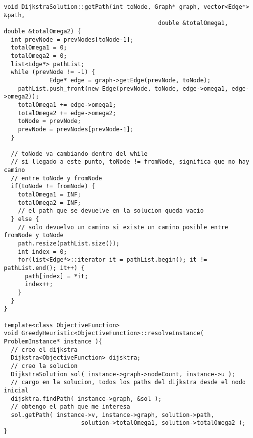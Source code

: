 \small
\begin{verbatim}
void DijkstraSolution::getPath(int toNode, Graph* graph, vector<Edge*> &path, 
                                            double &totalOmega1, double &totalOmega2) {           
  int prevNode = prevNodes[toNode-1];
  totalOmega1 = 0;
  totalOmega2 = 0;    
  list<Edge*> pathList;
  while (prevNode != -1) {
             Edge* edge = graph->getEdge(prevNode, toNode);
    pathList.push_front(new Edge(prevNode, toNode, edge->omega1, edge->omega2));
    totalOmega1 += edge->omega1;
    totalOmega2 += edge->omega2;
    toNode = prevNode;
    prevNode = prevNodes[prevNode-1];
  }    

  // toNode va cambiando dentro del while
  // si llegado a este punto, toNode != fromNode, significa que no hay camino 
  // entre toNode y fromNode  
  if(toNode != fromNode) {
    totalOmega1 = INF;
    totalOmega2 = INF;
    // el path que se devuelve en la solucion queda vacio
  } else {
    // solo devuelvo un camino si existe un camino posible entre fromNode y toNode
    path.resize(pathList.size());
    int index = 0;
    for(list<Edge*>::iterator it = pathList.begin(); it != pathList.end(); it++) {
      path[index] = *it;
      index++;
    }
  }
}

template<class ObjectiveFunction>
void GreedyHeuristic<ObjectiveFunction>::resolveInstance( ProblemInstance* instance ){
  // creo el dijkstra
  Dijkstra<ObjectiveFunction> dijsktra;
  // creo la solucion
  DijkstraSolution sol( instance->graph->nodeCount, instance->u );
  // cargo en la solucion, todos los paths del dijkstra desde el nodo inicial
  dijsktra.findPath( instance->graph, &sol );
  // obtengo el path que me interesa
  sol.getPath( instance->v, instance->graph, solution->path, 
                      solution->totalOmega1, solution->totalOmega2 );
}

\end{verbatim}
\normalsize

